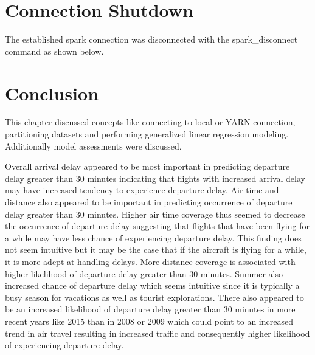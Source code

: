 \documentclass[12pt,twoside]{amherstthesis}
\begin{document}
  \begin{Shaded}
  \begin{Highlighting}[]
  \StringTok{ }\NormalTok{(}  
  \end{Highlighting}
  \end{Shaded}
  
  \section{Connection Shutdown}\label{connection-shutdown}
  
  The established spark connection was disconnected with the
  spark\_disconnect command as shown below.
  
  \begin{Shaded}
  \begin{Highlighting}[]
  \NormalTok{(}\NormalTok{) }
  \end{Highlighting}
  \end{Shaded}
  
  \section{Conclusion}\label{conclusion}
  
  This chapter discussed concepts like connecting to local or YARN
  connection, partitioning datasets and performing generalized linear
  regression modeling. Additionally model assessments were discussed.
  
  Overall arrival delay appeared to be most important in predicting
  departure delay greater than 30 minutes indicating that flights with
  increased arrival delay may have increased tendency to experience
  departure delay. Air time and distance also appeared to be important in
  predicting occurrence of departure delay greater than 30 minutes. Higher
  air time coverage thus seemed to decrease the occurrence of departure
  delay suggesting that flights that have been flying for a while may have
  less chance of experiencing departure delay. This finding does not seem
  intuitive but it may be the case that if the aircraft is flying for a
  while, it is more adept at handling delays. More distance coverage is
  associated with higher likelihood of departure delay greater than 30
  minutes. Summer also increased chance of departure delay which seems
  intuitive since it is typically a busy season for vacations as well as
  tourist explorations. There also appeared to be an increased likelihood
  of departure delay greater than 30 minutes in more recent years like
  2015 than in 2008 or 2009 which could point to an increased trend in air
  travel resulting in increased traffic and consequently higher likelihood
  of experiencing departure delay.
  
\end{document}
